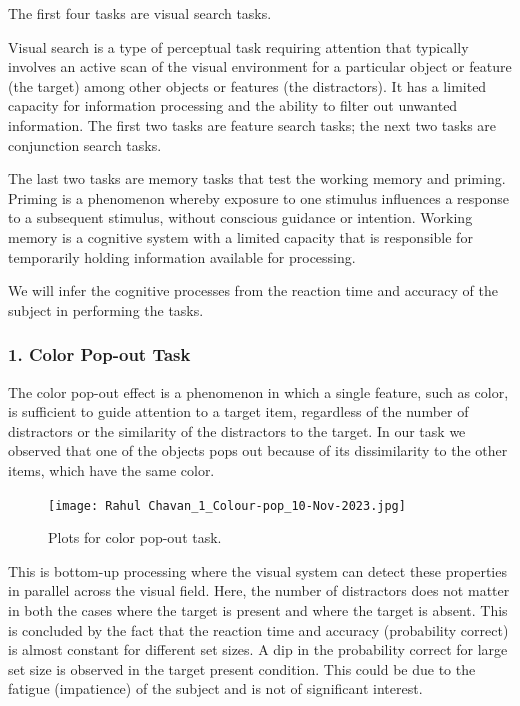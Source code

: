 \documentclass{report}
\begin{document}
The first four tasks are visual search tasks.

Visual search is a type of perceptual task requiring 
attention that typically involves an active scan of the 
visual environment for a particular object or feature 
(the target) among other objects or features (the distractors). 
It has a limited capacity for information processing and the 
ability to filter out unwanted information. The first two tasks 
are feature search tasks; the next two tasks are conjunction search 
tasks.

The last two tasks are memory tasks that test the working memory 
and priming. Priming is a phenomenon whereby exposure to one stimulus 
influences a response to a subsequent stimulus, without conscious 
guidance or intention. Working memory is a cognitive system with a 
limited capacity that is responsible for temporarily holding information 
available for processing.

We will infer the cognitive processes from the reaction time and 
accuracy of the subject in performing the tasks.






\subsubsection{1. Color Pop-out Task}

The color pop-out effect is a phenomenon in which a single feature, 
such as color, is sufficient to guide attention to a target item, 
regardless of the number of distractors or the similarity of the 
distractors to the target. In our task we observed that one of the 
objects pops out because of its dissimilarity to the other items, 
which have the same color.




\begin{figure}[htbp]  
  \centering 
  \texttt{[image: Rahul Chavan\_1\_Colour-pop\_10-Nov-2023.jpg]} 
  \caption{Plots for color pop-out task.}
  \label{fig: colour pop-out} 
\end{figure}

This is bottom-up processing where the visual system can detect 
these properties in parallel across the visual field. Here, the 
number of distractors does not matter in both the cases where the 
target is present and where the target is absent. This is concluded 
by the fact that the reaction time and accuracy (probability correct) 
is almost constant for different set sizes. A dip in the probability 
correct for large set size is observed in the target present condition. 
This could be due to the fatigue (impatience) of the subject and is not 
of significant interest.
\end{document}
